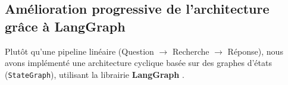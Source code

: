 



\subsection{Amélioration progressive de l'architecture grâce à LangGraph}

Plutôt qu'une pipeline linéaire (Question $\rightarrow$ Recherche $\rightarrow$ Réponse), nous avons implémenté une architecture cyclique basée sur des graphes d'états (\texttt{StateGraph}), utilisant la librairie \textbf{LangGraph} \cite{LangGraph}.

